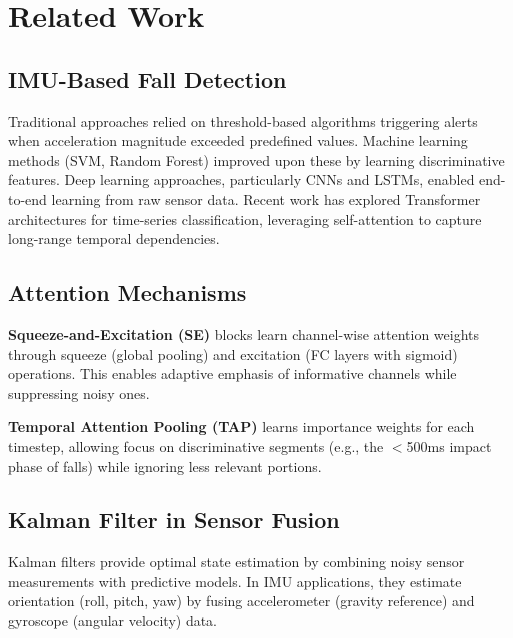 \documentclass{article}
\begin{document}
\section{Related Work}

\subsection{IMU-Based Fall Detection}

Traditional approaches relied on threshold-based algorithms triggering alerts when acceleration magnitude exceeded predefined values. Machine learning methods (SVM, Random Forest) improved upon these by learning discriminative features. Deep learning approaches, particularly CNNs and LSTMs, enabled end-to-end learning from raw sensor data. Recent work has explored Transformer architectures for time-series classification, leveraging self-attention to capture long-range temporal dependencies.

\subsection{Attention Mechanisms}

\textbf{Squeeze-and-Excitation (SE)} blocks learn channel-wise attention weights through squeeze (global pooling) and excitation (FC layers with sigmoid) operations. This enables adaptive emphasis of informative channels while suppressing noisy ones.

\textbf{Temporal Attention Pooling (TAP)} learns importance weights for each timestep, allowing focus on discriminative segments (e.g., the $<$500ms impact phase of falls) while ignoring less relevant portions.

\subsection{Kalman Filter in Sensor Fusion}

Kalman filters provide optimal state estimation by combining noisy sensor measurements with predictive models. In IMU applications, they estimate orientation (roll, pitch, yaw) by fusing accelerometer (gravity reference) and gyroscope (angular velocity) data.

\end{document}
